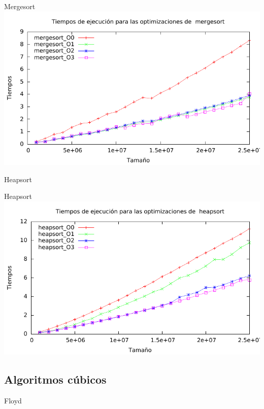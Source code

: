 \documentclass[10pt,compress,usetitleprogressbar,mathserif]{beamer}
\begin{document}
\begin{frame}{Mergesort}
	\includegraphics[width = \textwidth ]{img/mergesort_optim_g.pdf}
\end{frame}

\begin{frame}{Heapsort}
	
\end{frame}

\begin{frame}{Heapsort}
	\includegraphics[width = \textwidth ]{img/heapsort_optim_g.pdf}
\end{frame}

\subsection{Algoritmos cúbicos}

\begin{frame}{Floyd}
	
\end{frame}
\end{document}
